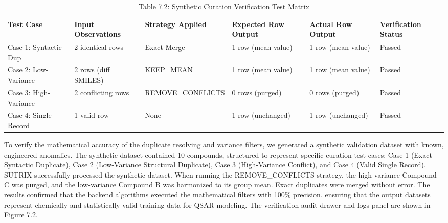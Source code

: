 \begin{table}[htbp]
  \centering
  \caption{Table 7.2: Synthetic Curation Verification Test Matrix}
  \label{tab:table_7_case}
  \begin{tabular}{llllll}
    \toprule
    Test Case & Input Observations & Strategy Applied & Expected Row Output & Actual Row Output & Verification Status \\
    \midrule
    Case 1: Syntactic Dup & 2 identical rows & Exact Merge & 1 row (mean value) & 1 row (mean value) & Passed \\
    Case 2: Low-Variance & 2 rows (diff SMILES) & KEEP\_MEAN & 1 row (mean value) & 1 row (mean value) & Passed \\
    Case 3: High-Variance & 2 conflicting rows & REMOVE\_CONFLICTS & 0 rows (purged) & 0 rows (purged) & Passed \\
    Case 4: Single Record & 1 valid row & None & 1 row (unchanged) & 1 row (unchanged) & Passed \\
    \bottomrule
  \end{tabular}
\end{table}

To verify the mathematical accuracy of the duplicate resolving and variance filters, we generated a synthetic validation dataset with known, engineered anomalies. The synthetic dataset contained 10 compounds, structured to represent specific curation test cases: Case 1 (Exact Syntactic Duplicate), Case 2 (Low-Variance Structural Duplicate), Case 3 (High-Variance Conflict), and Case 4 (Valid Single Record). SUTRIX successfully processed the synthetic dataset. When running the REMOVE\_CONFLICTS strategy, the high-variance Compound C was purged, and the low-variance Compound B was harmonized to its group mean. Exact duplicates were merged without error. The results confirmed that the backend algorithms executed the mathematical filters with 100\% precision, ensuring that the output datasets represent chemically and statistically valid training data for QSAR modeling. The verification audit drawer and logs panel are shown in Figure 7.2.

